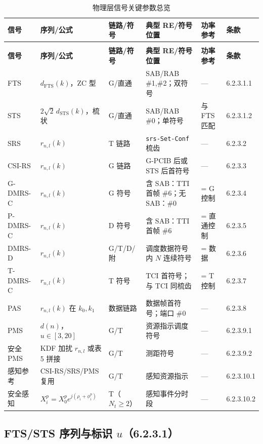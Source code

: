 \documentclass[11pt,a4paper]{ctexart}
\begin{document}
\begin{longtable}{@{}>{\small}L{2.2cm}>{\small}L{3.2cm}>{\small}L{2.2cm}>{\small}L{2.8cm}>{\small}L{2.8cm}>{\small}L{1.5cm}@{}}
\caption{物理层信号关键参数总览} \\
\toprule
\textbf{信号} & \textbf{序列/公式} & \textbf{链路/符号} & \textbf{典型 RE/符号位置} & \textbf{功率参考} & \textbf{条款} \\
\midrule
\endfirsthead
{} \\
\toprule
\textbf{信号} & \textbf{序列/公式} & \textbf{链路/符号} & \textbf{典型 RE/符号位置} & \textbf{功率参考} & \textbf{条款} \\
\midrule
\endhead
\bottomrule
\endfoot
FTS &
$d_{\mathrm{FTS}}(k)$，ZC 型 &
G/直通 &
SAB/RAB \#1,\#2；双符号 &
--- &
6.2.3.1.1 \\
STS &
$2\sqrt{2}\,d_{\mathrm{STS}}(k)$，梳状 &
G/直通 &
SAB/RAB \#0；单符号 &
与 FTS 匹配 &
6.2.3.1.2 \\
SRS &
$r_{n,l}(k)$ &
T 链路 &
\texttt{srs-Set-Conf} 梳齿 &
--- &
6.2.3.2 \\
CSI-RS &
$r_{n,l}(k)$ &
G 链路 &
G-PCIB 后或 STS 后首符号 &
--- &
6.2.3.3 \\
G-DMRS-C &
$r_{n,l}(k)$ &
G 符号 &
含 SAB：TTI 首帧 \#6；无 SAB：\#0 &
= G 控制 &
6.2.3.4 \\
P-DMRS-C &
$r_{n,l}(k)$ &
D 符号 &
含 SAB：TTI 首帧 \#6 &
= 直通控制 &
6.2.3.5 \\
DMRS-D &
$r_{n,l}(k)$ &
G/T/D/附 &
调度数据符号内 $N$ 连续符号 &
= 数据 &
6.2.3.6 \\
T-DMRS-C &
$r_{n,l}(k)$ &
T 符号 &
TCI 首符号；与 TCI 同梳齿 &
= T 控制 &
6.2.3.7 \\
PAS &
$r_{n,l}(k)$ 在 $k_0,k_1$ &
数据链路 &
数据帧首符号；端口 \#0 &
--- &
6.2.3.8 \\
PMS &
$d(n)$，$u{\in}[3,20]$ &
G/T &
资源指示调度符号 &
--- &
6.2.3.9.1 \\
安全 PMS &
KDF 加扰 $r_{n,l}$ 或表 5 拼接 &
G/T &
测距符号 &
--- &
6.2.3.9.2 \\
感知参考 &
CSI-RS/SRS/PMS 复用 &
G/T &
感知资源指示 &
--- &
6.2.3.10.1 \\
安全感知 &
$X_i^p = X_0^p e^{j(\rho_i+\phi_i^p)}$ &
T（$N_t{\geq}2$） &
感知事件分时段 &
--- &
6.2.3.10.2 \\
\end{longtable}

\subsection{FTS/STS 序列与标识 $u$（6.2.3.1）}
\end{document}
